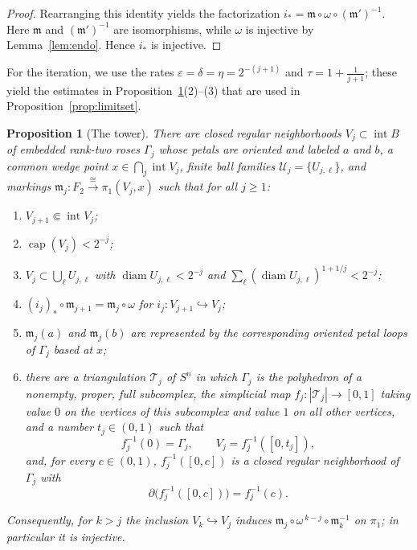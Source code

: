 \documentclass[12pt,oneside,a4paper]{article}
\newtheorem{proposition}[definition]{Proposition}
\theoremstyle{mytheorem}
\theoremstyle{remark}
\theoremstyle{definition}
\begin{document}
\begin{proof}
Rearranging this identity yields the factorization
\(i_* = \mathfrak{m} \circ \omega \circ (\mathfrak{m}')^{-1}\).
Here $\mathfrak{m}$ and $(\mathfrak{m}')^{-1}$ are isomorphisms, while $\omega$ is
injective by Lemma~\ref{lem:endo}.  Hence $i_*$ is injective.
\end{proof}




For the iteration, we use the rates
$\varepsilon=\delta=\eta=2^{-(j+1)}$ and
$\tau=1+\frac1{j+1}$; these yield the estimates in
Proposition~\ref{induction}\textup{(2)}--\textup{(3)} that are used in
Proposition~\ref{prop:limitset}.

\begin{proposition}[The tower]\label{induction}
There are closed regular neighborhoods $V_j\subset\operatorname{int}B$ of
embedded rank-two roses $\Gamma_j$ whose petals are oriented and labeled
$a$ and $b$, a common wedge point
$x\in\bigcap_j\operatorname{int}V_j$, finite ball families
$\mathcal{U}_j=\{U_{j,\ell}\}$, and markings
$\mathfrak{m}_j:F_2\xrightarrow{\cong}\pi_1(V_j,x)$ such that for all
$j\ge1$:
\begin{enumerate}
\item $V_{j+1}\Subset\operatorname{int}V_j$;
\item $\operatorname{cap}(V_j)<2^{-j}$;
\item $V_j\subset\bigcup_\ell U_{j,\ell}$ with
$\operatorname{diam}U_{j,\ell}<2^{-j}$ and
$\sum_\ell(\operatorname{diam}U_{j,\ell})^{1+1/j}<2^{-j}$;
\item $(i_j)_*\circ\mathfrak{m}_{j+1}=\mathfrak{m}_j\circ\omega$ for
$i_j:V_{j+1}\hookrightarrow V_j$;
\item $\mathfrak{m}_j(a)$ and $\mathfrak{m}_j(b)$ are represented by the
corresponding oriented petal loops of $\Gamma_j$ based at $x$;
\item there are a triangulation $\mathcal{T}_j$ of $S^n$ in which
$\Gamma_j$ is the polyhedron of a nonempty, proper, full subcomplex, the simplicial map
$f_j:|\mathcal{T}_j|\to[0,1]$ taking value $0$ on the vertices of this
subcomplex and value $1$ on all other vertices, and a number
$t_j\in(0,1)$ such that
\[
f_j^{-1}(0)=\Gamma_j,\qquad V_j=f_j^{-1}([0,t_j]),
\]
and, for every $c\in(0,1)$, $f_j^{-1}([0,c])$ is a closed regular
neighborhood of $\Gamma_j$ with
\[
\partial\bigl(f_j^{-1}([0,c])\bigr)=f_j^{-1}(c).
\]
\end{enumerate}
Consequently, for $k>j$ the inclusion $V_k\hookrightarrow V_j$
induces $\mathfrak{m}_j\circ\omega^{\,k-j}\circ\mathfrak{m}_k^{-1}$ on $\pi_1$; in
particular it is injective.
\end{proposition}
\end{document}
